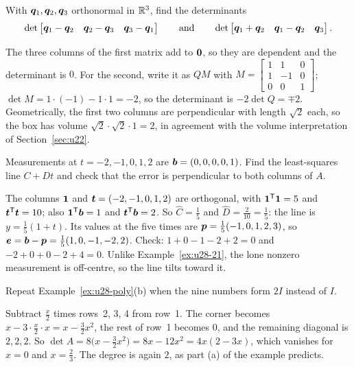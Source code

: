 \begin{exercise}\label{exr:u28-q2}
With $\boldsymbol{q}_1,\boldsymbol{q}_2,\boldsymbol{q}_3$ orthonormal in $\mathbb{R}^{3}$, find the determinants
\[
  \det\begin{bmatrix}\boldsymbol{q}_1-\boldsymbol{q}_2&\boldsymbol{q}_2-\boldsymbol{q}_3&\boldsymbol{q}_3-\boldsymbol{q}_1\end{bmatrix}
  \qquad\text{and}\qquad
  \det\begin{bmatrix}\boldsymbol{q}_1+\boldsymbol{q}_2&\boldsymbol{q}_1-\boldsymbol{q}_2&\boldsymbol{q}_3\end{bmatrix}.
\]
\end{exercise}
\begin{solution}
The three columns of the first matrix add to $\boldsymbol{0}$, so they are dependent and the
determinant is $0$. For the second, write it as $QM$ with
$M=\left[\begin{smallmatrix} 1&1&0\\ 1&-1&0\\ 0&0&1\end{smallmatrix}\right]$;
$\det M=1\cdot(-1)-1\cdot1=-2$, so the determinant is $-2\det Q=\mp2$. Geometrically, the
first two columns are perpendicular with length $\sqrt2$ each, so the box has volume
$\sqrt2\cdot\sqrt2\cdot1=2$, in agreement with the volume interpretation of Section~\ref{sec:u22}.
\end{solution}

\begin{exercise}\label{exr:u28-5pts}
Measurements at $t=-2,-1,0,1,2$ are $\boldsymbol{b}=(0,0,0,0,1)$. Find the least-squares line
$C+Dt$ and check that the error is perpendicular to both columns of $A$.
\end{exercise}
\begin{solution}
The columns $\boldsymbol{1}$ and $\boldsymbol{t}=(-2,-1,0,1,2)$ are orthogonal, with $\boldsymbol{1}^{\mathsf{T}}\boldsymbol{1}=5$ and
$\boldsymbol{t}^{\mathsf{T}}\boldsymbol{t}=10$; also $\boldsymbol{1}^{\mathsf{T}}\boldsymbol{b}=1$ and $\boldsymbol{t}^{\mathsf{T}}\boldsymbol{b}=2$. So $\hat C=\tfrac15$ and
$\hat D=\tfrac2{10}=\tfrac15$: the line is $y=\tfrac15(1+t)$. Its values at the five times are
$\boldsymbol{p}=\tfrac15(-1,0,1,2,3)$, so $\boldsymbol{e}=\boldsymbol{b}-\boldsymbol{p}=\tfrac15(1,0,-1,-2,2)$. Check:
$1+0-1-2+2=0$ and $-2+0+0-2+4=0$. Unlike Example~\ref{ex:u28-21}, the lone nonzero
measurement is off-centre, so the line tilts toward it.
\end{solution}

\begin{exercise}\label{exr:u28-poly2}
Repeat Example~\ref{ex:u28-poly}(b) when the nine numbers form $2I$ instead of $I$.
\end{exercise}
\begin{solution}
Subtract $\tfrac{x}{2}$ times rows~2, 3, 4 from row~1. The corner becomes
$x-3\cdot\tfrac{x}{2}\cdot x=x-\tfrac32x^{2}$, the rest of row~1 becomes $0$, and the
remaining diagonal is $2,2,2$. So $\det A=8\bigl(x-\tfrac32x^{2}\bigr)=8x-12x^{2}=4x(2-3x)$,
which vanishes for $x=0$ and $x=\tfrac23$. The degree is again $2$, as part (a) of the
example predicts.
\end{solution}
